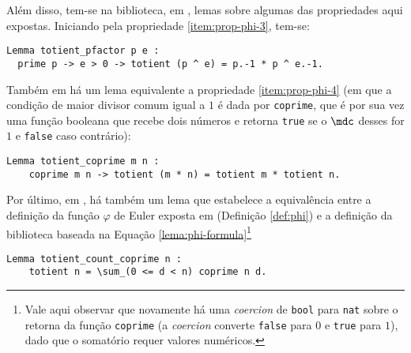 Além disso, tem-se na biblioteca, em \cite{mathcomp-prime}, lemas sobre algumas das propriedades aqui expostas. Iniciando pela propriedade \ref{item:prop-phi-3}, tem-se:
\begin{lstlisting}[language=coq,frame=single,tabsize=1]
Lemma totient_pfactor p e :
  prime p -> e > 0 -> totient (p ^ e) = p.-1 * p ^ e.-1.
\end{lstlisting}
Também em \cite{mathcomp-prime} há um lema equivalente a propriedade \ref{item:prop-phi-4} (em que a condição de maior divisor comum igual a $1$ é dada por \lstinline[language = coq]{coprime}, que é por sua vez uma função booleana que recebe dois números e retorna \lstinline[language = coq]{true} se o $\mdc$ desses for $1$ e \lstinline[language = coq]{false} caso contrário):
\begin{lstlisting}[language=coq,frame=single,tabsize=1]
Lemma totient_coprime m n :
    coprime m n -> totient (m * n) = totient m * totient n.
\end{lstlisting}
Por último, em \cite{mathcomp-prime}, há também um lema que estabelece a equivalência entre a definição da função $\varphi$ de Euler exposta em \cite[p.~48]{book:2399854} (Definição \ref{def:phi}) e a definição da biblioteca baseada na Equação \ref{lema:phi-formula}\footnote{Vale aqui observar que novamente há uma \textit{coercion} de \lstinline[language = coq]{bool} para \lstinline[language = coq]{nat} sobre o retorna da função \lstinline[language = coq]{coprime} (a \textit{coercion} converte \lstinline[language = coq]{false} para $0$ e \lstinline[language = coq]{true} para $1$), dado que o somatório requer valores numéricos.}%
\begin{lstlisting}[language=coq,frame=single,tabsize=1]
Lemma totient_count_coprime n : 
    totient n = \sum_(0 <= d < n) coprime n d.
\end{lstlisting} 


